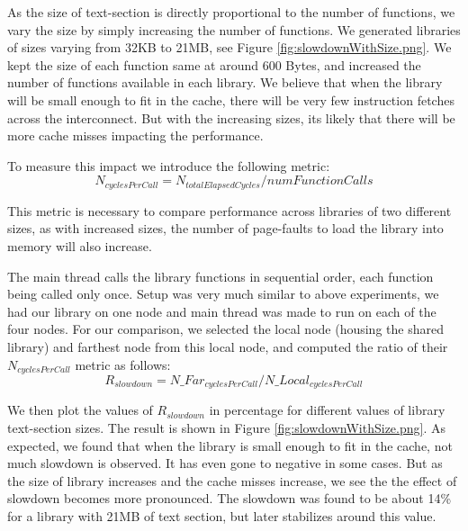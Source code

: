 As the size of text-section is directly proportional to the number of functions, we vary the size by simply 
increasing the number of functions. We generated libraries of sizes varying from 32KB to 21MB, see Figure \ref{fig:slowdownWithSize.png}.
We kept the size of each function same at around 600 Bytes, and increased the number of functions available in each library.
We believe that when the library will be small enough to fit in the cache, there will be very few instruction fetches across the interconnect.
But with the increasing sizes, its likely that there will be more cache misses impacting the performance.

To measure this impact we introduce the following metric:
\begin{dmath}
\label{eqn:cyclesPerCall}
N_{cyclesPerCall} =  N_{totalElapsedCycles} / numFunctionCalls
\end{dmath}

This metric is necessary to compare performance across libraries of two different sizes, as with increased sizes, the number
of page-faults to load the library into memory will also increase.

The main thread calls the library functions in sequential order, each function being called only once.
Setup was very much similar to above experiments, we had our library on one node and main thread was made to run on 
each of the four nodes. For our comparison, we selected the local node (housing the shared library) and farthest node
from this local node, and computed the ratio of their $N_{cyclesPerCall}$ metric as follows:
\begin{dmath}
\label{eqn:slowdown}
R_{slowdown} =  N\_Far_{cyclesPerCall} / N\_Local_{cyclesPerCall}
\end{dmath}

We then plot the values of $R_{slowdown}$ in percentage for different values of library text-section sizes.
The result is shown in Figure \ref{fig:slowdownWithSize.png}.
As expected, we found that when the library is small enough to fit in the cache, not much slowdown is observed.
It has even gone to negative in some cases. But as the size of library increases and the cache misses increase,
we see the the effect of slowdown becomes more pronounced. The slowdown was found to be about 14\% for a library
with 21MB of text section, but later stabilizes around this value.


